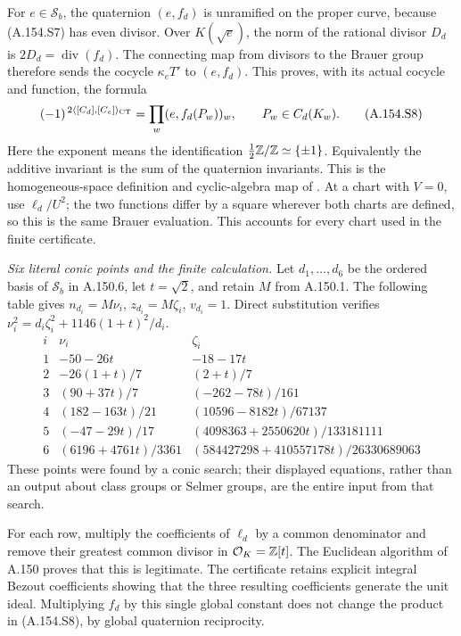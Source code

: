 For \(e\in\mathcal S_b\), the quaternion
\((e,f_d)\) is unramified on the proper curve,
because (A.154.S7) has even divisor.
Over \(K(\sqrt e)\), the norm of the rational
divisor \(D_d\) is \(2D_d=\operatorname{div}(f_d)\).
The connecting map from divisors to the Brauer group
therefore sends the cocycle \(\kappa_e T'\) to
\((e,f_d)\).  This proves, with its actual cocycle
and function, the formula
\[
 (-1)^{\,2\langle[C_d],[C_e]\rangle_{\rm CT}}
       =\prod_w(e,f_d(P_w))_w,\qquad P_w\in C_d(K_w).
\tag{A.154.S8}
\]
Here the exponent means the identification
\(\tfrac12\mathbb Z/\mathbb Z\simeq\{\pm1\}\).
Equivalently the additive invariant is the sum
of the quaternion invariants.
This is the homogeneous-space definition and
cyclic-algebra map of
\cite[Section 4, equation (10), and Lemma 5.1]
{AgentFisherBinaryQuartics2022}.
At a chart with \(V=0\), use \(\ell_d/U^2\);
the two functions differ by a square wherever
both charts are defined, so this is the same
Brauer evaluation.  This accounts for every
chart used in the finite certificate.

\emph{Six literal conic points and the finite calculation.}
Let \(d_1,\ldots,d_6\) be the ordered basis of
\(\mathcal S_b\) in A.150.6, let \(t=\sqrt2\),
and retain \(M\) from A.150.1.  The following table
gives \(n_{d_i}=M\nu_i\), \(z_{d_i}=M\zeta_i\),
\(v_{d_i}=1\).  Direct substitution verifies
\(\nu_i^2=d_i\zeta_i^2+1146(1+t)^2/d_i\).
\[
 \begin{array}{c|c|c}
 i&\nu_i&\zeta_i\\ \hline
 1&-50-26t&-18-17t\\
 2&-26(1+t)/7&(2+t)/7\\
 3&(90+37t)/7&(-262-78t)/161\\
 4&(182-163t)/21&(10596-8182t)/67137\\
 5&(-47-29t)/17&(4098363+2550620t)/133181111\\
 6&(6196+4761t)/3361&
           (584427298+410557178t)/26330689063
 \end{array}
\tag{A.154.S9}
\]
These points were found by a conic search; their
displayed equations, rather than an output about
class groups or Selmer groups, are the entire
input from that search.

For each row, multiply the coefficients of
\(\ell_d\) by a common denominator and remove
their greatest common divisor in
\(\mathcal O_K=\mathbb Z[t]\).
The Euclidean algorithm of A.150 proves that
this is legitimate.  The certificate retains
explicit integral Bezout coefficients showing
that the three resulting coefficients generate
the unit ideal.  Multiplying \(f_d\) by this
single global constant does not change the
product in (A.154.S8), by global quaternion
reciprocity.

